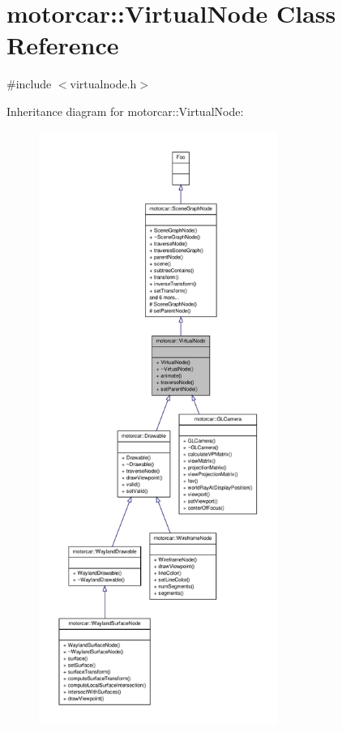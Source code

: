 \hypertarget{classmotorcar_1_1VirtualNode}{\section{motorcar\-:\-:Virtual\-Node Class Reference}
\label{classmotorcar_1_1VirtualNode}
}


{\ttfamily \#include $<$virtualnode.\-h$>$}



Inheritance diagram for motorcar\-:\-:Virtual\-Node\-:
\nopagebreak
\begin{figure}[H]
\begin{center}
\leavevmode
\includegraphics[height=550pt]{classmotorcar_1_1VirtualNode__inherit__graph}
\end{center}
\end{figure}


